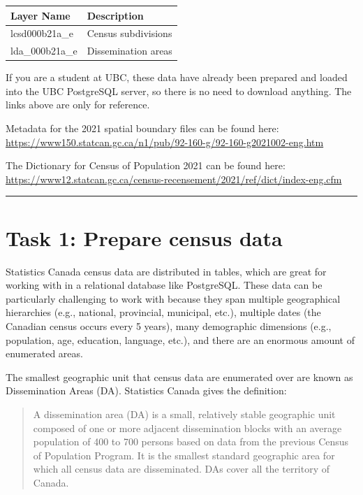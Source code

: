 \documentclass[
]{book}
\begin{document}
\begin{longtable}[]{@{}ll@{}}
\toprule\noalign{}
Layer Name & Description \\
\midrule\noalign{}
\endhead
\bottomrule\noalign{}
\endlastfoot
lcsd000b21a\_e & Census subdivisions \\
lda\_000b21a\_e & Dissemination areas \\
\end{longtable}

If you are a student at UBC, these data have already been prepared and loaded into the UBC PostgreSQL server, so there is no need to download anything. The links above are only for reference.

Metadata for the 2021 spatial boundary files can be found here: \url{https://www150.statcan.gc.ca/n1/pub/92-160-g/92-160-g2021002-eng.htm}

The Dictionary for Census of Population 2021 can be found here: \url{https://www12.statcan.gc.ca/census-recensement/2021/ref/dict/index-eng.cfm}

\begin{center}\rule{0.5\linewidth}{0.5pt}\end{center}

\hypertarget{task-1-prepare-census-data}{%
\section*{Task 1: Prepare census data}\label{task-1-prepare-census-data}}

Statistics Canada census data are distributed in tables, which are great for working with in a relational database like PostgreSQL. These data can be particularly challenging to work with because they span multiple geographical hierarchies (e.g., national, provincial, municipal, etc.), multiple dates (the Canadian census occurs every 5 years), many demographic dimensions (e.g., population, age, education, language, etc.), and there are an enormous amount of enumerated areas.

The smallest geographic unit that census data are enumerated over are known as Dissemination Areas (DA). Statistics Canada gives the definition:

\begin{quote}
A dissemination area (DA) is a small, relatively stable geographic unit composed of one or more adjacent dissemination blocks with an average population of 400 to 700 persons based on data from the previous Census of Population Program. It is the smallest standard geographic area for which all census data are disseminated. DAs cover all the territory of Canada.
\end{quote}
\end{document}
